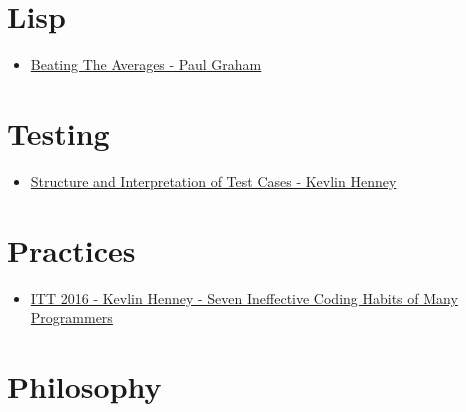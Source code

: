 \documentclass[11pt]{article}
\begin{document}
\section{Lisp}
\label{sec:org8de4b48}

\begin{itemize}
\item \href{http://www.paulgraham.com/avg.html}{Beating The Averages - Paul Graham}
\end{itemize}

\section{Testing}
\label{sec:org3eec661}

\begin{itemize}
\item \href{https://www.youtube.com/watch?v=tWn8RA\_DEic}{Structure and Interpretation of Test Cases - Kevlin Henney}
\end{itemize}

\section{Practices}
\label{sec:org3de6b8b}

\begin{itemize}
\item \href{https://www.youtube.com/watch?v=ZsHMHukIlJY}{ITT 2016 - Kevlin Henney - Seven Ineffective Coding Habits of Many Programmers}
\end{itemize}

\section{Philosophy}
\label{sec:org734563c}
\end{document}
